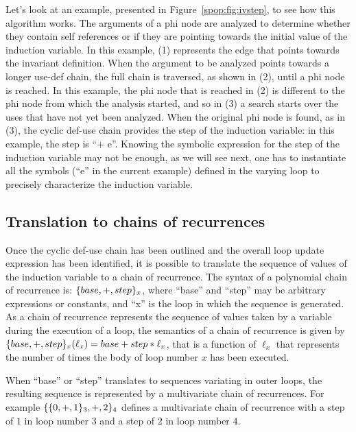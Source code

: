 Let's look at an example, presented in Figure~\ref{spop:fig:ivstep},
to see how this algorithm works.  The arguments of a phi node are
analyzed to determine whether they contain self references or if they
are pointing towards the initial value of the induction variable.  In
this example, (1) represents the edge that points towards the
invariant definition.  When the argument to be analyzed points towards
a longer use-def chain, the full chain is traversed, as shown in (2),
until a phi node is reached.  In this example, the phi node that is
reached in (2) is different to the phi node from which the analysis
started, and so in (3) a search starts over the uses that have not yet
been analyzed.  When the original phi node is found, as in (3), the
cyclic def-use chain provides the step of the induction variable: in
this example, the step is ``+ e''.  Knowing the symbolic expression
for the step of the induction variable may not be enough, as we will
see next, one has to instantiate all the symbols (``e'' in the current
example) defined in the varying loop to precisely characterize the
induction variable.

\subsection{Translation to chains of recurrences}

Once the cyclic def-use chain has been outlined and the overall loop
update expression has been identified, it is possible to translate the
sequence of values of the induction variable to a chain of recurrence.
The syntax of a polynomial chain of recurrence is: $\{base, +,
  step\}_x$, where ``base'' and ``step'' may be arbitrary expressions
or constants, and ``x'' is the loop in which the sequence is
generated.  As a chain of recurrence represents the sequence of values
taken by a variable during the execution of a loop, the semantics of a
chain of recurrence is given by $\{base, +, step\}_x (\ell_x) =
base + step * \ell_x$, that is a function of $\ell_x$ that represents
the number of times the body of loop number $x$ has been executed.

When ``base'' or ``step'' translates to sequences variating in outer
loops, the resulting sequence is represented by a multivariate chain
of recurrences.  For example $\{\{0, +, 1\}_3, +, 2\}_4$
defines a multivariate chain of recurrence with a step of $1$ in loop
number $3$ and a step of $2$ in loop number $4$.

